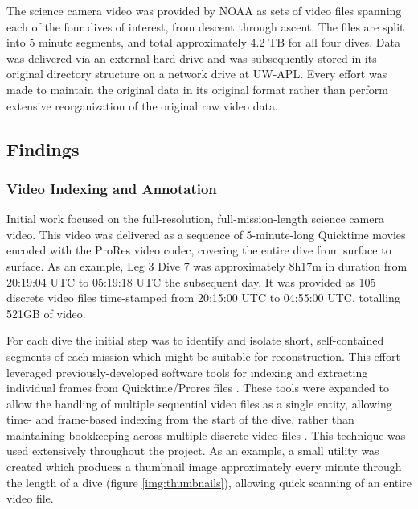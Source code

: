 \documentclass[letterpaper,12pt]{article}
\begin{document}
The science camera video was provided by NOAA as sets of video files spanning each of the four dives of interest, from descent through ascent.   The files are split into 5 minute segments, and total approximately 4.2 TB for all four dives.   Data was delivered via an external hard drive and was subsequently stored in its original directory structure on a network drive at UW-APL.  Every effort was made to maintain the original data in its original format rather than perform extensive reorganization of the original raw video data.

\subsection{Findings}

\subsubsection{Video Indexing and Annotation}

Initial work focused on the full-resolution, full-mission-length science camera video.  This video was delivered as a sequence of 5-minute-long Quicktime movies encoded with the ProRes video codec, covering the entire dive from surface to surface.    As an example, Leg 3 Dive 7 was approximately 8h17m in duration from 20:19:04 UTC to 05:19:18 UTC the subsequent day.  It was provided as 105 discrete video files time-stamped from 20:15:00 UTC to 04:55:00 UTC, totalling 521GB of video. 

For each dive the initial step was to identify and isolate short, self-contained segments of each mission which might be suitable for reconstruction.   This effort leveraged previously-developed software tools for indexing and extracting individual frames from Quicktime/Prores files \cite{goquicktime}.  These tools were expanded to allow the handling of multiple sequential video files as a single entity, allowing time- and frame-based indexing from the start of the dive, rather than maintaining bookkeeping across multiple discrete video files \cite{goframeset}.  This technique was used extensively throughout the project.  As an example, a small utility was created which produces a thumbnail image approximately every minute through the length of a dive (figure \ref{img:thumbnails}), allowing quick scanning of an entire video file.
\end{document}
